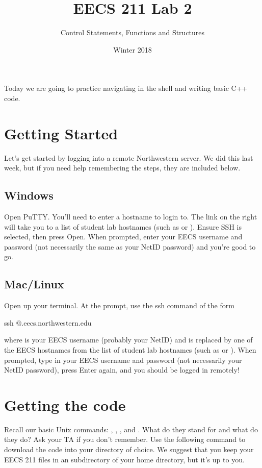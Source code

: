 \documentclass{tufte-handout}
\title{EECS 211 Lab 2}
\author{Control Statements, Functions and Structures}
\date{Winter 2018}
\begin{document}
\maketitle

Today we are going to practice navigating in the shell and writing basic C++ code. 

\section{Getting Started}
Let's get started by logging into a remote Northwestern server. We did this last week, but if you need help remembering the steps, they are included below.

\subsection{Windows}
Open PuTTY. You'll need to enter a hostname to login to. The link on the right will take you to a list of student lab hostnames (such as   or ).  Ensure SSH is selected, then press Open. When prompted, enter your EECS username and password (not necessarily the same as your NetID password) and you're good to go.

\subsection{Mac/Linux}
Open up your terminal. At the prompt, use the ssh command of the form
\begin{CmdLine}
  \prompt ssh @.eecs.northwestern.edu
\end{CmdLine}
\noindent where  is your EECS username (probably your NetID)
and  is replaced by one of the EECS hostnames from the list
of student lab hostnames (such as  or
).
When prompted, type in your EECS username and password (not necessarily your NetID password), press
Enter again, and you should be logged in remotely!

\section{Getting the code}
Recall our basic Unix commands: , , , and . What do they stand for and what do they do? Ask your TA if you don't remember. Use the following  command to download the code into your directory of choice. We suggest that you keep your EECS 211 files in an  subdirectory of your home directory, but it's up to you.
\end{document}
